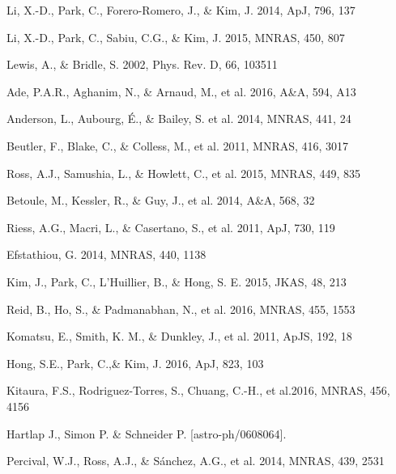 \documentclass{natureprintstyle}
\begin{document}
\begin{thebibliography}{10}
Li, X.-D., Park, C., Forero-Romero, J., \& Kim, J. 2014, ApJ, 796, 137

Li, X.-D., Park, C., Sabiu, C.G., \& Kim, J. 2015, MNRAS, 450, 807 

Lewis, A., \& Bridle, S. 2002, Phys. Rev. D, 66, 103511

Ade, P.A.R., Aghanim, N., \& Arnaud, M., et al. 2016, A\&A, 594, A13 

Anderson, L., Aubourg, \'E., \& Bailey, S. et al. 2014, MNRAS, 441, 24 

Beutler, F., Blake, C., \& Colless, M., et al. 2011, MNRAS, 416, 3017

Ross, A.J., Samushia, L., \& Howlett, C., et al. 2015, MNRAS, 449, 835

Betoule, M., Kessler, R., \& Guy, J., et al. 2014, A\&A, 568, 32

Riess, A.G., Macri, L., \& Casertano, S., et al. 2011, ApJ, 730, 119

Efstathiou, G. 2014, MNRAS, 440, 1138

Kim, J., Park, C., L'Huillier, B., \& Hong, S. E. 2015, JKAS, 48, 213




Reid, B., Ho, S., \& Padmanabhan, N., et al.  2016, MNRAS, 455, 1553

Komatsu, E., Smith, K. M., \& Dunkley, J., et al. 2011, ApJS, 192, 18  

Hong, S.E., Park, C.,\&  Kim, J. 2016, ApJ, 823, 103

Kitaura, F.S., Rodriguez-Torres, S., Chuang, C.-H., et al.2016, MNRAS, 456, 4156

Hartlap J., Simon P. \& Schneider P. [astro-ph/0608064].

Percival, W.J., Ross, A.J., \& S\'{a}nchez, A.G., et al. 2014, MNRAS, 439, 2531

\end{thebibliography}
\end{document}
